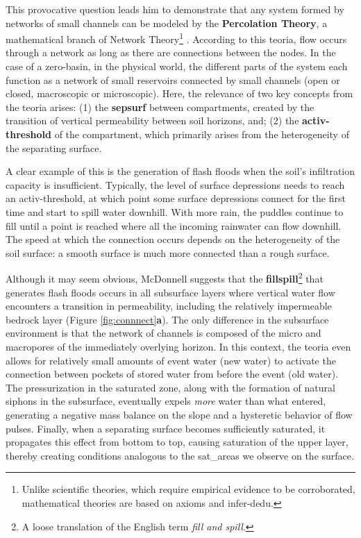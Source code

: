 \documentclass[./main_en.tex]{subfiles}
\begin{document}
\par This provocative question leads him to demonstrate that any \gls{system} formed by networks of small channels can be modeled by the \textbf{Percolation Theory}, a mathematical branch of Network Theory\footnote{Unlike scientific theories, which require empirical evidence to be corroborated, mathematical theories are based on axioms and \gls{infer-dedu}.} \cite{Janzen2015a}. According to this \gls{teoria}, flow occurs through a network as long as there are connections between the nodes. In the case of a \gls{zero-basin}, in the physical world, the different parts of the \gls{system} each function as a network of small reservoirs connected by small channels (open or closed, macroscopic or microscopic). Here, the relevance of two key concepts from the \gls{teoria} arises: (1) the \textbf{\gls{sepsurf}} between compartments, created by the transition of vertical permeability between soil horizons, and; (2) the \textbf{\gls{activ-threshold}} of the compartment, which primarily arises from the heterogeneity of the separating surface.

\par A clear example of this is the generation of flash floods when the soil's infiltration capacity is insufficient. Typically, the level of surface depressions needs to reach an \gls{activ-threshold}, at which point some surface depressions connect for the first time and start to spill water downhill. With more rain, the puddles continue to fill until a point is reached where all the incoming rainwater can flow downhill. The speed at which the connection occurs depends on the heterogeneity of the soil surface: a smooth surface is much more connected than a rough surface.

\par Although it may seem obvious, McDonnell suggests that the \textbf{\gls{fillspill}}\footnote{A loose translation of the English term \textit{fill and spill}.} that generates flash floods occurs in all subsurface layers where vertical water flow encounters a transition in permeability, including the relatively impermeable bedrock layer (Figure \ref{fig:connnect}\textbf{a}). The only difference in the subsurface environment is that the network of channels is composed of the micro and macropores of the immediately overlying horizon. In this context, the \gls{teoria} even allows for relatively small amounts of event water (new water) to activate the connection between pockets of stored water from before the event (old water). The pressurization in the saturated zone, along with the formation of natural siphons in the subsurface, eventually expels \textit{more} water than what entered, generating a negative mass balance on the slope and a hysteretic behavior of flow pulses. Finally, when a separating surface becomes sufficiently saturated, it propagates this effect from bottom to top, causing saturation of the upper layer, thereby creating conditions analogous to the \gls{sat_areas} we observe on the surface.
\end{document}
